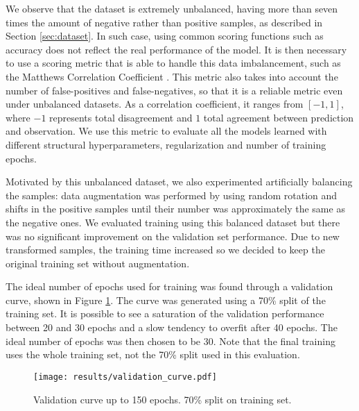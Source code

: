 	We observe that the dataset is extremely unbalanced, having more than seven times the amount of negative rather than positive samples, as described in Section \ref{sec:dataset}. In such case, using common scoring functions such as accuracy does not reflect the real performance of the model. It is then necessary to use a scoring metric that is able to handle this data imbalancement, such as the Matthews Correlation Coefficient \cite{evaluationMetrics}. This metric also takes into account the number of false-positives and false-negatives, so that it is a reliable metric even under unbalanced datasets. As a correlation coefficient, it ranges from $[-1,1]$, where $-1$ represents total disagreement and $1$ total agreement between prediction and observation. We use this metric to evaluate all the models learned with different structural hyperparameters, regularization and number of training epochs.

	Motivated by this unbalanced dataset, we also experimented artificially balancing the samples: data augmentation was performed by using random rotation and shifts in the positive samples until their number was approximately the same as the negative ones. We evaluated training using this balanced dataset but there was no significant improvement on the validation set performance. Due to new transformed samples, the training time increased so we decided to keep the original training set without augmentation.

        The ideal number of epochs used for training was found through a validation curve, shown in Figure \ref{fig:validation_curve}. The curve was generated using a 70\% split of the training set. It is possible to see a saturation of the validation performance between 20 and 30 epochs and a slow tendency to overfit after 40 epochs. The ideal number of epochs was then chosen to be 30. Note that the final training uses the whole training set, not the 70\% split used in this evaluation.

        \begin{figure}
        \centering
        \texttt{[image: results/validation\_curve.pdf]}
        \caption{Validation curve up to 150 epochs. 70\% split on training set.}
        \label{fig:validation_curve}
        \end{figure}

